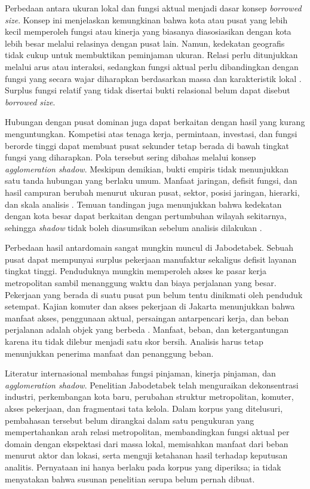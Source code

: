 \documentclass[11pt,a4paper,oneside,openany,indonesian]{report}
\begin{document}
Perbedaan antara ukuran lokal dan fungsi aktual menjadi dasar konsep \emph{borrowed size}. Konsep ini menjelaskan kemungkinan bahwa kota atau pusat yang lebih kecil memperoleh fungsi atau kinerja yang biasanya diasosiasikan dengan kota lebih besar melalui relasinya dengan pusat lain. Namun, kedekatan geografis tidak cukup untuk membuktikan peminjaman ukuran. Relasi perlu ditunjukkan melalui arus atau interaksi, sedangkan fungsi aktual perlu dibandingkan dengan fungsi yang secara wajar diharapkan berdasarkan massa dan karakteristik lokal \parencite{meijersburger2017,meijersetal2016}. Surplus fungsi relatif yang tidak disertai bukti relasional belum dapat disebut \emph{borrowed size}.

Hubungan dengan pusat dominan juga dapat berkaitan dengan hasil yang kurang menguntungkan. Kompetisi atas tenaga kerja, permintaan, investasi, dan fungsi berorde tinggi dapat membuat pusat sekunder tetap berada di bawah tingkat fungsi yang diharapkan. Pola tersebut sering dibahas melalui konsep \emph{agglomeration shadow}. Meskipun demikian, bukti empiris tidak menunjukkan satu tanda hubungan yang berlaku umum. Manfaat jaringan, defisit fungsi, dan hasil campuran berubah menurut ukuran pusat, sektor, posisi jaringan, hierarki, dan skala analisis \parencite{volgmannrusche2020,yangzhudu2022,zhenshilu2023}. Temuan tandingan juga menunjukkan bahwa kedekatan dengan kota besar dapat berkaitan dengan pertumbuhan wilayah sekitarnya, sehingga \emph{shadow} tidak boleh diasumsikan sebelum analisis dilakukan \parencite{partridgeetal2009,sunding2016}.

Perbedaan hasil antardomain sangat mungkin muncul di Jabodetabek. Sebuah pusat dapat mempunyai surplus pekerjaan manufaktur sekaligus defisit layanan tingkat tinggi. Penduduknya mungkin memperoleh akses ke pasar kerja metropolitan sambil menanggung waktu dan biaya perjalanan yang besar. Pekerjaan yang berada di suatu pusat pun belum tentu dinikmati oleh penduduk setempat. Kajian komuter dan akses pekerjaan di Jakarta menunjukkan bahwa manfaat akses, penggunaan aktual, persaingan antarpencari kerja, dan beban perjalanan adalah objek yang berbeda \parencite{andani2021,aritenang2022,andani2025}. Manfaat, beban, dan ketergantungan karena itu tidak dilebur menjadi satu skor bersih. Analisis harus tetap menunjukkan penerima manfaat dan penanggung beban.

Literatur internasional membahas fungsi pinjaman, kinerja pinjaman, dan \emph{agglomeration shadow}. Penelitian Jabodetabek telah menguraikan dekonsentrasi industri, perkembangan kota baru, perubahan struktur metropolitan, komuter, akses pekerjaan, dan fragmentasi tata kelola. Dalam korpus yang ditelusuri, pembahasan tersebut belum dirangkai dalam satu pengukuran yang mempertahankan arah relasi metropolitan, membandingkan fungsi aktual per domain dengan ekspektasi dari massa lokal, memisahkan manfaat dari beban menurut aktor dan lokasi, serta menguji ketahanan hasil terhadap keputusan analitis. Pernyataan ini hanya berlaku pada korpus yang diperiksa; ia tidak menyatakan bahwa susunan penelitian serupa belum pernah dibuat.
\end{document}
